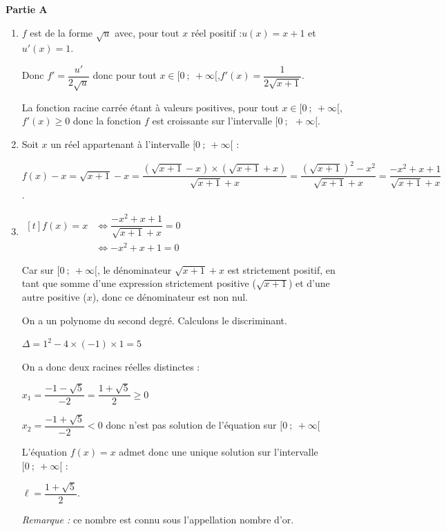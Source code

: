 \medskip
\textbf{Partie A}

\begin{enumerate}
	\item  $f$ est de la forme $\sqrt{u}$ avec, pour tout $x$ réel positif :\quad  $u(x)= x+1$ \quad et \quad $u'(x)=1$.

	Donc \quad $f'= \dfrac{u'}{2\sqrt{u}}$ \quad donc pour tout $x \in [0~;~+\infty[$,\quad  $f'(x) =   \dfrac{1}{2\sqrt{x+1}}$.

	La fonction racine carrée étant à valeurs positives, pour tout $x \in [0~;~+\infty[$, $f'(x) \geqslant 0$  donc la fonction $f$ est croissante  sur l'intervalle $[0~;~~+\infty[$.

	\item Soit $x$ un réel appartenant à l'intervalle $[0~;~+\infty[$ :

	$f(x) - x =  \sqrt{x+1} -x =    \dfrac {   \left(  \sqrt{x+1} -x    \right) \times   \left(  \sqrt{x+1} +x    \right)  }    {  \sqrt{x+1} +x    }    =      \dfrac {   \left(  \sqrt{x+1}    \right) ^2- x^2  } {   \sqrt{x+1} +x     }     =      \dfrac{-x^2 + x + 1}{\sqrt{x + 1} + x}$.


	\item  $\begin{aligned}[t] f(x) = x &\iff  \dfrac{-x^2 + x + 1}{\sqrt{x + 1} + x} = 0  \\
	&\iff -x^2+x+1=0\end{aligned}$

	Car sur $[0~;~+\infty[$, le dénominateur $\sqrt{x+1} + x$ est strictement positif, en tant que somme d'une expression strictement positive ($\sqrt{x+1}$) et d'une autre positive ($x$), donc ce dénominateur est non nul.

	On a un polynome du second degré. Calculons le discriminant.

	$\Delta = 1^2-4 \times (-1) \times 1= 5$

	On a donc deux racines réelles distinctes :

	$x_1 = \dfrac{-1-\sqrt{5}}{-2}= \dfrac{1 +\sqrt 5}{2}\geqslant 0$


	$x_2= \dfrac{-1+\sqrt{5}}{-2}<0$ \quad donc n'est pas solution de l'équation sur $[0~;~+\infty[$


	L'équation $f(x)=x$ admet donc une unique solution  sur l'intervalle $[0~;~+\infty[$ :

	$\ell = \dfrac{1 +\sqrt 5}{2}$.

	\emph{Remarque :} ce nombre est connu sous l'appellation \og nombre d'or\fg{}.

\end{enumerate}

